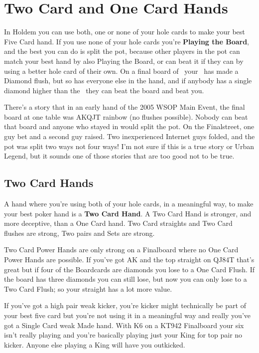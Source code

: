 \chapter{Two Card and One Card Hands}


In Holdem you can use both, one or none of your hole cards to make your
best Five Card hand. If you use none of your hole cards you're
\textbf{Playing the Board}, and the best you can do is split the
pot, because other players in the pot can match your best hand by also
Playing the Board, or can beat it if they can by using a better hole
card of their own. On a final board of \Ad\nined\eigd\Jd\sixd\ your
\Qc\Qs\ has made a Diamond flush, but so has everyone else in the hand,
and if anybody has a single diamond higher than the \sixd\ they can
beat the board and beat you.

There's a story that in an early hand of the 2005 WSOP Main Event,
the final board at one table was AKQJT rainbow (no flushes
possible). Nobody can beat that board and anyone who stayed in would
split the pot. On the Finalstreet, one guy bet and a second guy
raised. Two inexperienced Internet guys folded, and the pot was split
two ways not four ways! I'm not sure if this is a true story or Urban
Legend, but it sounds one of those stories that are too good not to be
true.

\section{Two Card Hands}

A hand where you're using both of your hole cards, in a meaningful
way, to make your best poker hand is a \textbf{Two Card
Hand}. A Two Card Hand is stronger, and more deceptive, than a
One Card hand. Two Card straights and Two Card flushes are
strong, Two pairs and Sets are strong.

Two Card Power Hands are only strong on a Finalboard where no
One Card Power Hands are possible. If you've got AK and the top
straight on QJ84T that's great but if four of the Boardcards are
diamonds you lose to a One Card Flush. If the board has three
diamonds you can still lose, but now you can only lose to a Two
Card Flush; so your straight has a lot more value.

If you've got a high pair weak kicker, you're kicker might technically
be part of your best five card but you're not using it in a meaningful
way and really you've got a Single Card weak Made hand. With K6 on a
KT942 Finalboard your six isn't really playing and you're
basically playing just your King for top pair no kicker. Anyone else
playing a King will have you outkicked.

